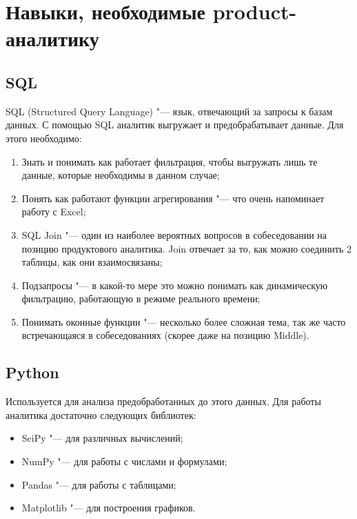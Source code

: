 \documentclass[referat, times]{SCWorks}
\begin{document}
\section{Навыки, необходимые product-аналитику}

\subsection{SQL}
SQL (Structured Query Language) "--- язык, отвечающий за запросы к базам данных. С помощью SQL аналитик выгружает и предобрабатывает данные. Для этого необходимо:
\begin{enumerate}
    \item Знать и понимать как работает фильтрация, чтобы выгружать лишь те данные, которые необходимы в данном случае;
    \item Понять как работают функции агрегирования "--- что очень напоминает работу с Excel;
    \item SQL Join "--- один из наиболее вероятных вопросов в собеседовании на позицию продуктового аналитика. Join отвечает за то, как можно соединить 2 таблицы, как они взаимосвязаны;
    \item Подзапросы "--- в какой-то мере это можно понимать как динамическую фильтрацию, работающую в режиме реального времени;
    \item Понимать оконные функции "--- несколько более сложная тема, так же часто встречающаяся в собеседованиях (скорее даже на позицию Middle)\cite{sql}.
\end{enumerate}

\subsection{Python}
Используется для анализа предобработанных до этого данных. 
Для работы аналитика достаточно следующих библиотек:

\begin{itemize}
    \item SciPy "--- для различных вычислений;
    \item NumPy "--- для работы с числами и формулами;
    \item Pandas "--- для работы с таблицами;
    \item Matplotlib "--- для построения графиков.
\end{itemize}
\end{document}
